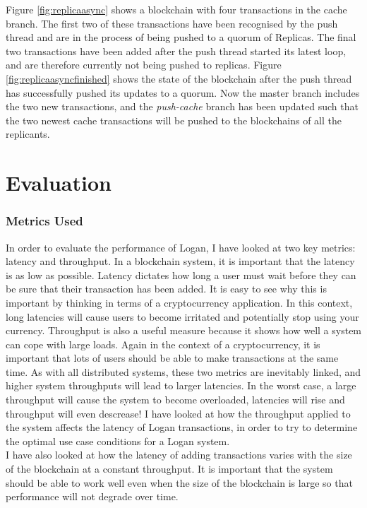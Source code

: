 \documentclass[12pt,a4paper,twoside,openright]{report}
\begin{document}
	Figure \ref{fig:replicaasync} shows a blockchain with four transactions in the cache branch.
	The first two of these transactions have been recognised by the push thread and are in the process of being pushed to a quorum of Replicas. 
	The final two transactions have been added after the push thread started its latest loop, and are therefore currently not being pushed to replicas.
	Figure \ref{fig:replicaasyncfinished} shows the state of the blockchain after the push thread has successfully pushed its updates to a quorum.
	Now the master branch includes the two new transactions, and the \textit{push-cache} branch has been updated such that the two newest cache transactions will be pushed to the blockchains of all the replicants.

	\chapter{Evaluation}

	\subsection*{Metrics Used}
	In order to evaluate the performance of Logan, I have looked at two key metrics: latency and throughput.
	In a blockchain system, it is important that the latency is as low as possible. 
	Latency dictates how long a user must wait before they can be sure that their transaction has been added.
	It is easy to see why this is important by thinking in terms of a cryptocurrency application.
	In this context, long latencies will cause users to become irritated and potentially stop using your currency.
	Throughput is also a useful measure because it shows how well a system can cope with large loads.
	Again in the context of a cryptocurrency, it is important that lots of users should be able to make transactions at the same time.
	As with all distributed systems, these two metrics are inevitably linked, and higher system throughputs will lead to larger latencies. 
	In the worst case, a large throughput will cause the system to become overloaded, latencies will rise and throughput will even descrease!
	I have looked at how the throughput applied to the system affects the latency of Logan transactions, in order to try to determine the optimal use case conditions for a Logan system.\\

	I have also looked at how the latency of adding transactions varies with the size of the blockchain at a constant throughput.
	It is important that the system should be able to work well even when the size of the blockchain is large so that performance will not degrade over time.
	
\end{document}
